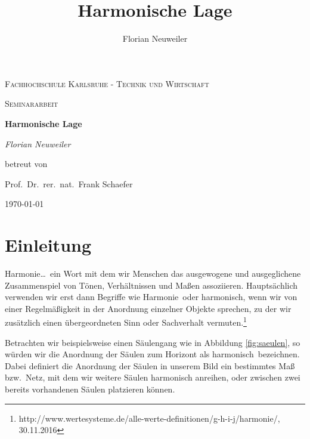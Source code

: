\documentclass[12pt,a4paper]{article}
\author{Florian Neuweiler}
\date{}
\title{Harmonische Lage}
\begin{document}

\setlength{\columnsep}{1.5cm}
\setlength{\columnseprule}{1pt}

\theoremstyle{definition}

\begin{titlepage}
\centering
{\scshape\LARGE Fachhochschule Karlsruhe - Technik und Wirtschaft \par}
\vspace{1cm}
{\scshape\Large Seminararbeit\par}
\vspace{1.5cm}
{\huge\bfseries Harmonische Lage\par}
\vspace{1.5cm}
{\Large\itshape Florian Neuweiler\par}
\vspace{1.5cm}
betreut von\par
Prof.~Dr.~rer.~nat.~Frank Schaefer
\vspace{2cm}

\vfill
{\large \today\par}
\end{titlepage}

\newpage
\tableofcontents

\newpage

\setlength{\parindent}{0pt}

\section{Einleitung}
Harmonie\dots ~ein Wort mit dem wir Menschen das ausgewogene und ausgeglichene Zusammenspiel von Tönen, Verhältnissen und Maßen assoziieren. Hauptsächlich verwenden wir erst dann Begriffe wie \glqq Harmonie\grqq ~oder \glqq harmonisch\grqq , wenn wir von einer Regelmäßigkeit in der Anordnung einzelner Objekte sprechen, zu der wir zusätzlich einen übergeordneten Sinn oder Sachverhalt vermuten.\footnote{http://www.wertesysteme.de/alle-werte-definitionen/g-h-i-j/harmonie/, 30.11.2016}

Betrachten wir beispielsweise einen Säulengang wie in Abbildung \ref{fig:saeulen}, so würden wir die Anordnung der Säulen zum Horizont als \glqq harmonisch\grqq ~bezeichnen. Dabei definiert die Anordnung der Säulen in unserem Bild ein bestimmtes Maß bzw.~Netz, mit dem wir weitere Säulen harmonisch anreihen, oder zwischen zwei bereits vorhandenen Säulen platzieren können.
\end{document}
